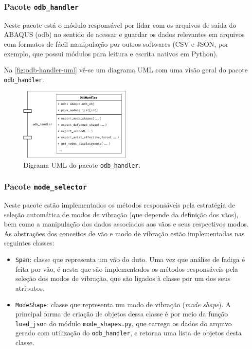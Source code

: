 \subsubsection{Pacote \texttt{odb\_handler}}


Neste pacote está o módulo responsável por lidar com os arquivos de saída do ABAQUS (odb) no sentido de acessar e guardar os dados relevantes em arquivos com formatos de fácil manipulação por outros softwares (CSV e JSON, por exemplo, que possui módulos para leitura e escrita nativos em Python).

Na \autoref{fig:odb-handler-uml} vê-se um diagrama UML com uma visão geral do pacote \texttt{odb\_handler}.

\begin{figure}[!ht]
    \centering
    \caption{Digrama UML do pacote \texttt{odb\_handler}.}\label{fig:odb-handler-uml}
    \includegraphics[width=0.5\textwidth]{imagens/odb-handler-uml}
\end{figure}


\subsubsection{Pacote \texttt{mode\_selector}}


Neste pacote estão implementados os métodos responsáveis pela estratégia de seleção automática de modos de vibração (que depende da definição dos vãos), bem como a manipulação dos dados associados aos vãos e seus respectivos modos. As abstrações dos conceitos de vão e modo de vibração estão implementadas nas seguintes classes:

\begin{itemize}
    \item \texttt{Span}: classe que representa um vão do duto. Uma vez que análise de fadiga é feita por vão, é nesta que são implementados os métodos responsáveis pela seleção dos modos de vibração, que são ligados à classe por um dos seus atributos.

    \item \texttt{ModeShape}: classe que representa um modo de vibração (\textit{mode shape}). A principal forma de criação de objetos dessa classe é por meio da função \texttt{load\_json} do módulo \texttt{mode\_shapes.py}, que carrega os dados do arquivo gerado com utilização do \texttt{odb\_handler}, e retorna uma lista de objetos desta classe.
\end{itemize}


